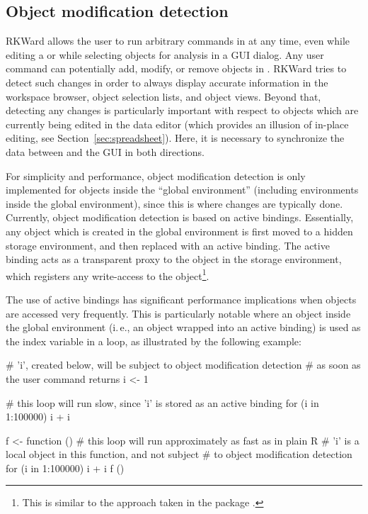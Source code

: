 \subsection{Object modification detection}
\label{sec:technical_omd}
RKWard allows the user to run arbitrary commands in  at any time, even while
editing a  or while selecting objects for analysis in a GUI dialog. Any user
command can potentially add, modify, or remove objects in . RKWard tries to
detect such changes in order to always display accurate information in the
workspace browser, object selection lists, and object views. Beyond that,
detecting any changes is particularly important with respect to objects which
are currently being edited in the data editor (which provides an illusion
of in-place editing, see Section~\ref{sec:spreadsheet}). Here, it is necessary to synchronize
the data between  and the GUI in both directions.

For simplicity and performance, object modification detection is only
implemented for objects inside the ``global environment'' (including environments
inside the global environment), since this is where changes are typically done.
Currently, object modification detection is based on active bindings.
Essentially, any object which is created in the global environment is first
moved to a hidden storage environment, and then replaced with an active binding.
The active binding acts as a transparent proxy to the object in the storage
environment, which registers any write-access to the object\footnote{
    This is similar to the approach taken in the  package \citep{Plate2009}.
}.

The use of active bindings has significant performance implications when
objects are accessed very frequently. This is particularly notable where an
object inside the global environment (i.\,e., an object wrapped into an active
binding) is used as the index variable in a loop, as illustrated by the
following example:

\begin{Code}
# 'i', created below, will be subject to object modification detection
# as soon as the user command returns
i <- 1

# this loop will run slow, since 'i' is stored as an active binding
for (i in 1:100000) i + i

f <- function () {
    # this loop will run approximately as fast as in plain R
    # 'i' is a local object in this function, and not subject
    # to object modification detection
    for (i in 1:100000) i + i
}
f ()
\end{Code}

